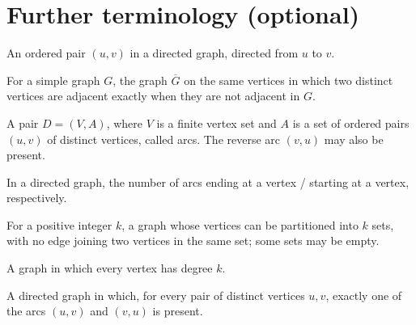 \section*{Further terminology (optional)}
\begin{description}[style=nextline]
\item[Arc] An ordered pair $(u,v)$ in a directed graph, directed from $u$ to $v$.
\item[Complement] For a simple graph $G$, the graph $\overline{G}$ on the same vertices in which two distinct vertices are adjacent exactly when they are not adjacent in $G$.
\item[Directed graph (digraph)] A pair $D=(V,A)$, where $V$ is a finite vertex set and $A$ is a set of ordered pairs $(u,v)$ of distinct vertices, called arcs. The reverse arc $(v,u)$ may also be present.
\item[In-degree / out-degree] In a directed graph, the number of arcs ending at a vertex / starting at a vertex, respectively.
\item[$k$-partite] For a positive integer $k$, a graph whose vertices can be partitioned into $k$ sets, with no edge joining two vertices in the same set; some sets may be empty.
\item[$k$-regular] A graph in which every vertex has degree $k$.
\item[Tournament] A directed graph in which, for every pair of distinct vertices $u,v$, exactly one of the arcs $(u,v)$ and $(v,u)$ is present.
\end{description}
